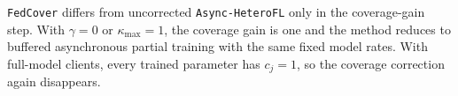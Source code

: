 \texttt{FedCover} differs from uncorrected \texttt{Async-HeteroFL} only in the coverage-gain step. With $\gamma=0$ or $\kappa_{\max}=1$, the coverage gain is one and the method reduces to buffered asynchronous partial training with the same fixed model rates. With full-model clients, every trained parameter has $c_j=1$, so the coverage correction again disappears.
